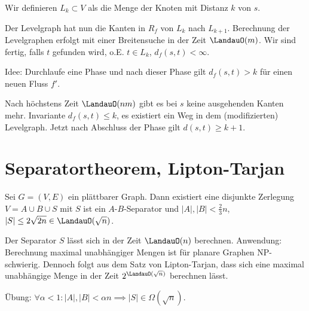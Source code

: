 Wir definieren $L_k \subset V$ als die Menge der Knoten mit Distanz $k$ von $s$.

Der Levelgraph hat nun die Kanten in $R_f$ von $L_k$ nach $L_{k+1}$.
Berechnung der Levelgraphen erfolgt mit einer Breitensuche in der Zeit $\LandauO(m)$.
Wir sind fertig, falls $t$ gefunden wird, o.E. $t \in L_k$, $d_f(s,t) < \infty$.

Idee: Durchlaufe eine Phase und nach dieser Phase gilt $d_f(s,t) > k$ für einen neuen Fluss $f'$.

\begin{algorithmic}
    \Else
    \EndIf
\end{algorithmic}
Nach höchstens Zeit $\LandauO(nm)$ gibt es bei $s$ keine ausgehenden Kanten mehr.
Invariante $d_f(s,t) \le k$, es existiert ein Weg in dem (modifizierten) Levelgraph.
Jetzt nach Abschluss der Phase gilt $d(s,t) \ge k + 1$.


\section{Separatortheorem, Lipton-Tarjan}

\begin{st}
    Sei $G = (V,E)$ ein plättbarer Graph.
    Dann existiert eine disjunkte Zerlegung $V = A \cup B \cup S$ mit $S$ ist ein $A$-$B$-Separator und $|A|, |B| < \frac{2}{3} n$, $|S| \le 2 \sqrt{2n} \in \LandauO(\sqrt n)$.
\end{st}

Der Separator $S$ lässt sich in der Zeit $\LandauO(n)$ berechnen.
Anwendung: Berechnung maximal unabhängiger Mengen ist für planare Graphen NP-schwierig.
Dennoch folgt aus dem Satz von Lipton-Tarjan, dass sich eine maximal unabhängige Menge in der Zeit $2^{\LandauO(\sqrt n)}$ berechnen lässt.

Übung: $\forall \alpha < 1 : |A|,|B| < \alpha n \implies |S| \in \Omega(\sqrt n)$.

